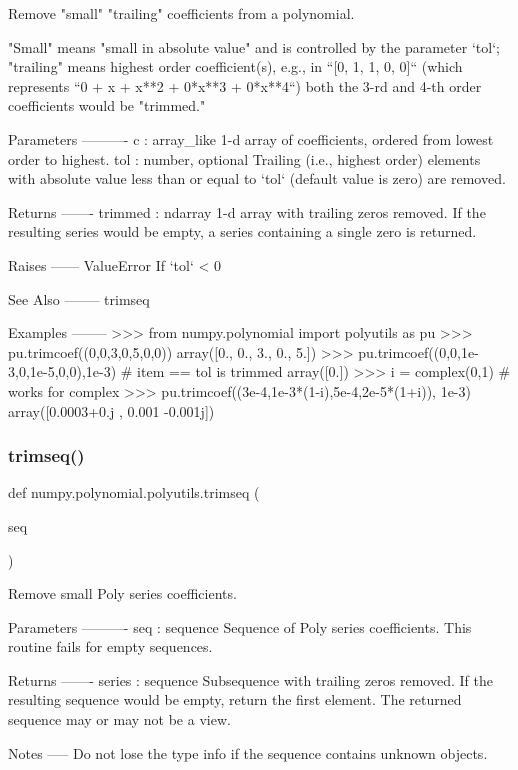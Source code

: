 \begin{DoxyVerb}Remove "small" "trailing" coefficients from a polynomial.

"Small" means "small in absolute value" and is controlled by the
parameter `tol`; "trailing" means highest order coefficient(s), e.g., in
``[0, 1, 1, 0, 0]`` (which represents ``0 + x + x**2 + 0*x**3 + 0*x**4``)
both the 3-rd and 4-th order coefficients would be "trimmed."

Parameters
----------
c : array_like
    1-d array of coefficients, ordered from lowest order to highest.
tol : number, optional
    Trailing (i.e., highest order) elements with absolute value less
    than or equal to `tol` (default value is zero) are removed.

Returns
-------
trimmed : ndarray
    1-d array with trailing zeros removed.  If the resulting series
    would be empty, a series containing a single zero is returned.

Raises
------
ValueError
    If `tol` < 0

See Also
--------
trimseq

Examples
--------
>>> from numpy.polynomial import polyutils as pu
>>> pu.trimcoef((0,0,3,0,5,0,0))
array([0.,  0.,  3.,  0.,  5.])
>>> pu.trimcoef((0,0,1e-3,0,1e-5,0,0),1e-3) # item == tol is trimmed
array([0.])
>>> i = complex(0,1) # works for complex
>>> pu.trimcoef((3e-4,1e-3*(1-i),5e-4,2e-5*(1+i)), 1e-3)
array([0.0003+0.j   , 0.001 -0.001j])\end{DoxyVerb}
 \mbox{\label{namespacenumpy_1_1polynomial_1_1polyutils_aea022dd7f5d8cfd3f8d165ba11f777ba}} 
\subsubsection{\texorpdfstring{trimseq()}{trimseq()}}
{\footnotesize\ttfamily def numpy.\+polynomial.\+polyutils.\+trimseq (\begin{DoxyParamCaption}\item[{}]{seq }\end{DoxyParamCaption})}

\begin{DoxyVerb}Remove small Poly series coefficients.

Parameters
----------
seq : sequence
    Sequence of Poly series coefficients. This routine fails for
    empty sequences.

Returns
-------
series : sequence
    Subsequence with trailing zeros removed. If the resulting sequence
    would be empty, return the first element. The returned sequence may
    or may not be a view.

Notes
-----
Do not lose the type info if the sequence contains unknown objects.\end{DoxyVerb}
 